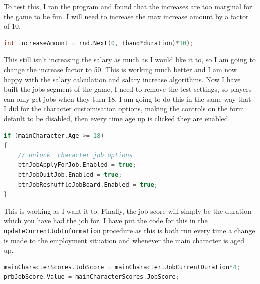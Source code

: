 To test this, I ran the program and found that the increases are too marginal for the game to be fun. I will need to increase the max increase amount by a factor of 10.
\begin{lstlisting}[language=c, style=csharp, caption=Salary increase amount calculation]
int increaseAmount = rnd.Next(0, (band*duration)*10);
\end{lstlisting}
This still isn't increasing the salary as much as I would like it to, so I am going to change the increase factor to 50. This is working much better and I am now happy with the salary calculation and salary increase algorithms.
Now I have built the jobs segment of the game, I need to remove the test settings, so players can only get jobs when they turn 18. I am going to do this in the same way that I did for the character customisation options, making the controls on the form default to be disabled, then every time age up is clicked they are enabled.
\begin{lstlisting}[language=c, style=csharp, caption=Age restriction for the jobs algorithms]
if (mainCharacter.Age >= 18)
{
    //'unlock' character job options
    btnJobApplyForJob.Enabled = true;
    btnJobQuitJob.Enabled = true;
    btnJobReshuffleJobBoard.Enabled = true;
}
\end{lstlisting}
This is working as I want it to.
Finally, the job score will simply be the duration which you have had the job for.
I have put the code for this in the \verb|updateCurrentJobInformation| procedure as this is both run every time a change is made to the employment situation and whenever the main character is aged up.
\begin{lstlisting}[language=c, style=csharp, caption=JobScore algorithm]
mainCharacterScores.JobScore = mainCharacter.JobCurrentDuration*4;
prbJobScore.Value = mainCharacterScores.JobScore;
\end{lstlisting}

